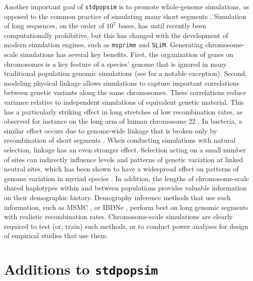 \documentclass[hidelinks]{article}
\newcommand{\stdpopsim}{\texttt{stdpopsim}\xspace}
\begin{document}
Another important goal of \stdpopsim is to promote whole-genome simulations,
as opposed to the common practice of simulating many short segments  \citep[see, e.g.,][]{harris2016genetic}.
Simulation of long sequences, on the order of $10^7$ bases,
has until recently been computationally prohibitive,
but this has changed with the development of modern simulation engines,
such as \texttt{msprime} and \texttt{SLiM}.
Generating chromosome-scale simulations has several key benefits.
First, the organization of genes on chromosomes is a key feature of a species' genome that is ignored in many traditional population genomic simulations
 (see \cite{schrider2020background} for a notable exception).
%
Second, modeling physical linkage allows simulations to capture
important correlations between genetic variants along the same chromosomes.
These correlations reduce variance relative to independent simulations of equivalent genetic material.
This has a particularly striking effect in long stretches of low recombination rates,
as observed for instance on the long arm of human chromosome 22 \citep{Dawson2002}.
In bacteria, a similar effect occurs due to genome-wide linkage that is broken only
by recombination of short segments \citep{Didelot2010}.
When conducting simulations with natural selection, linkage has
an even stronger effect. Selection acting on a small number of sites can
indirectly influence levels and patterns of genetic variation at linked neutral sites,
which has been shown to have a widespread
effect on patterns of genome variation in myriad species
\citep[e.g.,][]{McVicker2009,Charlesworth2012}. 
In addition, the lengths of chromosome-scale shared haplotypes within and
between populations provides valuable information on their demographic history.
Demography inference methods that use such information,
such as MSMC \citep{Schiffels2020}, or IBDNe \citep{browning2015accurate},
perform best on long genomic segments with realistic recombination rates.
Chromosome-scale simulations are clearly required to test (or, train) such methods,
or to conduct power analyses for design of empirical studies that use them.


\section*{Additions to \stdpopsim}
    \label{sec:expanded-catalog}

\end{document}
